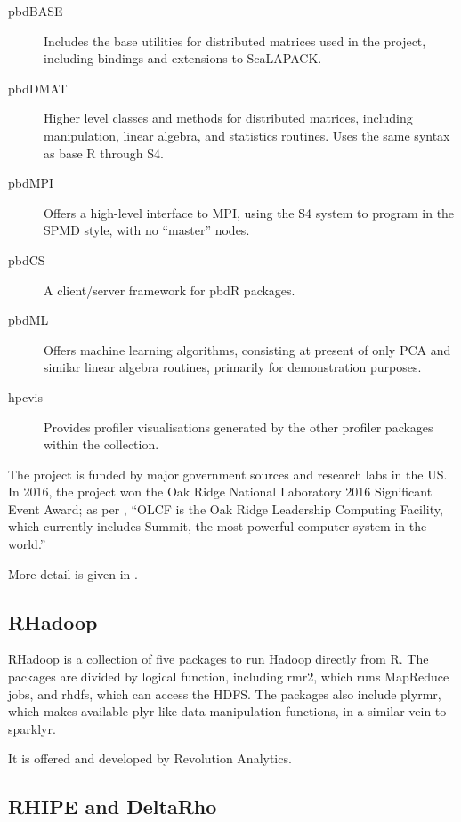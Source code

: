 \documentclass[a4paper,10pt]{article}
\begin{document}
\begin{description}
	\item[pbdBASE] Includes the base utilities for distributed matrices
	      used in the project, including bindings and extensions to ScaLAPACK\cite{pbdBASEpackage}.
	\item[pbdDMAT] Higher level classes and methods for distributed
	      matrices, including manipulation, linear algebra, and statistics
	      routines. Uses the same syntax as base R through S4\cite{pbdDMATpackage}.
	\item[pbdMPI] Offers a high-level interface to MPI, using the S4
	      system to program in the SPMD style, with no ``master'' nodes\cite{Chen2012pbdMPIpackage}.
	\item[pbdCS] A client/server framework for pbdR packages\cite{Schmidt2015pbdCSpackage}.
	\item[pbdML] Offers machine learning algorithms, consisting at present
	      of only PCA and similar linear algebra routines, primarily for
	      demonstration purposes\cite{schmidt20}.
	\item[hpcvis] Provides profiler visualisations generated by the other
	      profiler packages within the collection\cite{hpcvis}.
\end{description}

The project is funded by major government sources and research labs in
the US. In 2016, the project won the Oak Ridge National Laboratory
2016 Significant Event Award; as per \textcite{pbdR2012},
\enquote{OLCF is the Oak Ridge Leadership Computing Facility, which
	currently includes Summit, the most powerful computer system in the
	world.}

More detail is given in \textcite{pbdBASEvignette}.

\subsection{RHadoop}
\label{sec:rhadoop}

RHadoop is a collection of five packages to run Hadoop directly from
R\textcite{analytics:_rhadoop_wiki}. The packages are divided by
logical function, including rmr2, which runs MapReduce jobs, and
rhdfs, which can access the HDFS. The packages also include plyrmr,
which makes available plyr-like data manipulation functions, in a
similar vein to sparklyr.

It is offered and developed by Revolution Analytics.

\subsection{RHIPE and DeltaRho}
\label{sec:rhipe-deltarho}
\end{document}
